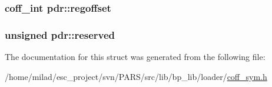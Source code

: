 \label{structpdr_afc6a6366a22fbc15d07b8a9d7f131a7c}
\hypertarget{structpdr_a747789523b1f89a8031be811da4fb699}{
\subsubsection[{regoffset}]{\setlength{\rightskip}{0pt plus 5cm}coff\_\-int {\bf pdr::regoffset}}}
\label{structpdr_a747789523b1f89a8031be811da4fb699}
\hypertarget{structpdr_a403af5a7dd48ca92af6aa1b47cf3b2b2}{
\subsubsection[{reserved}]{\setlength{\rightskip}{0pt plus 5cm}unsigned {\bf pdr::reserved}}}
\label{structpdr_a403af5a7dd48ca92af6aa1b47cf3b2b2}


The documentation for this struct was generated from the following file:\begin{DoxyCompactItemize}
\item 
/home/milad/esc\_\-project/svn/PARS/src/lib/bp\_\-lib/loader/\hyperlink{coff__sym_8h}{coff\_\-sym.h}\end{DoxyCompactItemize}
